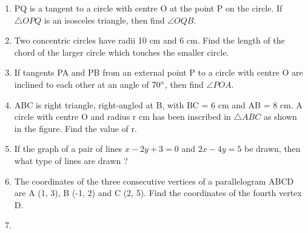 \documentclass{exam}
\begin{document}
\begin{enumerate}

		\item PQ is a tangent to a circle with centre O at the point P on the circle. If $\triangle OPQ$ is an isosceles triangle, then find $\angle OQB$. 
		
		\item Two concentric circles have radii 10 cm and 6 cm. Find the length of the chord of the larger circle which touches the smaller circle. 
		
		\item If tangents PA and PB from an external point P to a circle with centre O are inclined to each other at an angle of $70\degree$, then find $\angle POA$. 
		
		\item ABC is right triangle, right-angled at B, with BC = 6 cm and AB = 8 cm. A circle with centre O and radius r cm has been inscribed in $\triangle ABC$ as shown in the figure. Find the value of r. 
		

		\item If the graph of a pair of lines $x - 2y + 3 = 0$ and $2x - 4y = 5$ be drawn, then what type of lines are drawn ? 
		
		\item The coordinates of the three consecutive vertices of a parallelogram ABCD are A (1, 3), B (-1, 2) and C (2, 5). Find the coordinates of the fourth vertex D. 
		
		\item
		

\end{enumerate}
\end{document}
